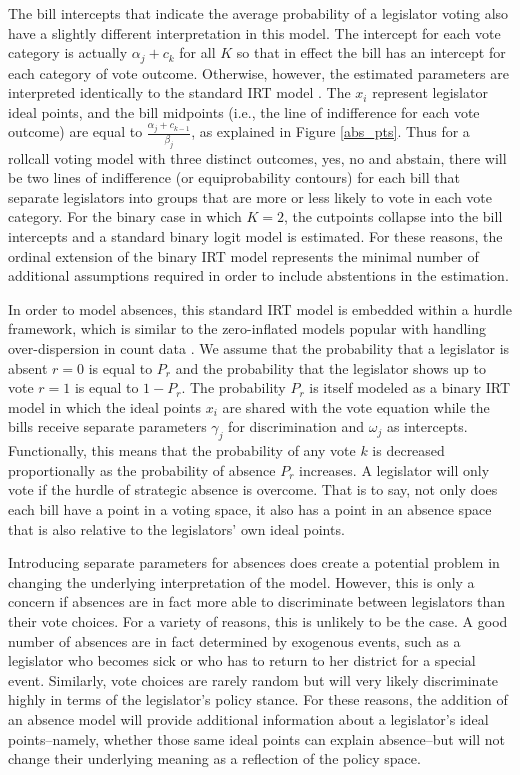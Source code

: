 	The bill intercepts that indicate the average probability of a legislator voting also have a slightly different interpretation in this model. The intercept for each vote category is actually $\alpha_j + c_k$ for all $K$ so that in effect the bill has an intercept for each category of vote outcome. Otherwise, however, the estimated parameters are interpreted identically to the standard IRT model \parencite{jackman2004}. The $x_i$ represent legislator ideal points, and the bill midpoints (i.e., the line of indifference for each vote outcome) are equal to $\frac{\alpha_j + c_{k-1}}{\beta_j}$, as explained in Figure \ref{abs_pts}. Thus for a rollcall voting model with three distinct outcomes, yes, no and abstain, there will be two lines of indifference (or equiprobability contours) for each bill that separate legislators into groups that are more or less likely to vote in each vote category. For the binary case in which $K=2$, the cutpoints collapse into the bill intercepts and a standard binary logit model is estimated. For these reasons, the ordinal extension of the binary IRT model represents the minimal number of additional assumptions required in order to include abstentions in the estimation.
	
	In order to model absences, this standard IRT model is embedded within a hurdle framework, which is similar to the zero-inflated models popular with handling over-dispersion in count data \parencite{zorn1998}. We assume that the probability that a legislator is absent $r=0$ is equal to $P_r$ and the probability that the legislator shows up to vote $r=1$ is equal to $1-P_r$. The probability $P_r$ is itself modeled as a binary IRT model in which the ideal points $x_i$ are shared with the vote equation while the bills receive separate parameters $\gamma_j$ for discrimination and $\omega_j$ as intercepts. Functionally, this means that the probability of any vote $k$ is decreased proportionally as the probability of absence $P_r$ increases. A legislator will only vote if the hurdle of strategic absence is overcome. That is to say, not only does each bill have a point in a voting space, it also has a point in an absence space that is also relative to the legislators' own ideal points.
	
	Introducing separate parameters for absences does create a potential problem in changing the underlying interpretation of the model. However, this is only a concern if absences are in fact more able to discriminate between legislators than their vote choices. For a variety of reasons, this is unlikely to be the case. A good number of absences are in fact determined by exogenous events, such as a legislator who becomes sick or who has to return to her district for a special event. Similarly, vote choices are rarely random but will very likely discriminate highly in terms of the legislator's policy stance. For these reasons, the addition of an absence model will provide additional information about a legislator's ideal points--namely, whether those same ideal points can explain absence--but will not change their underlying meaning as a reflection of the policy space. 
	
